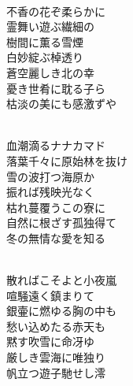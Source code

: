 \documentclass[10pt,b5j]{tarticle} %
\begin{document}
\vspace{1.5em} %
\newcommand{\linespace}{0.5em} %
\newcommand{\blocksize}{0.5\hsize} %
\newcommand{\itemmargin}{3em} %
\begin{enumerate} %
    \setlength{\itemindent}{\itemmargin} %
    \begin{minipage}[c]{\blocksize}
    
        \vspace{\linespace}
        \item~\\
        不香の花ぞ柔らかに\\
        霊舞い遊ぶ繊細の\\
        樹間に薫る雪煙\\
        白妙綻ぶ棹透り\\
        蒼空麗しき北の幸\\
        憂き世肴に耽る子ら\\
        枯淡の美にも感激ずや
        
    \end{minipage}
    \begin{minipage}[c]{\blocksize}
        
        \vspace{\linespace}
        \item~\\
        血潮滴るナナカマド\\
        落葉千々に原始林を抜け\\
        雪の波打つ海原か\\
        振れば残映光なく\\
        枯れ蔓覆うこの寮に\\
        自然に根ざす孤独得て\\
        冬の無情な愛を知る
        
    \end{minipage}
    \begin{minipage}[c]{\blocksize}
        
        \vspace{\linespace}
        \item~\\
        散ればこそよと小夜嵐\\
        喧騒遠く鎮まりて\\
        銀壷に燃ゆる胸の中も\\
        愁い込めたる赤天も\\
        黙す吹雪に命冴ゆ\\
        厳しき雲海に唯独り\\
        帆立つ遊子馳せし澪

    
    \end{minipage}
\end{enumerate} %
\end{document}
